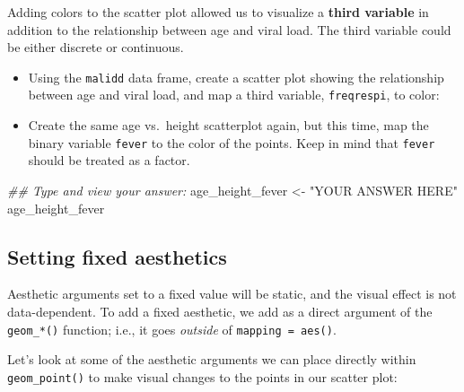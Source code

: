 \documentclass[
  letterpaper,
  DIV=11,
  numbers=noendperiod]{scrreprt}
\newenvironment{Shaded}{\begin{snugshade}}{\end{snugshade}}
\newcommand{\DocumentationTok}[1]{\textcolor[rgb]{0.37,0.37,0.37}{\textit{#1}}}
\newcommand{\NormalTok}[1]{\textcolor[rgb]{0.00,0.23,0.31}{#1}}
\newcommand{\OtherTok}[1]{\textcolor[rgb]{0.00,0.23,0.31}{#1}}
\newcommand{\StringTok}[1]{\textcolor[rgb]{0.13,0.47,0.30}{#1}}
\begin{document}
Adding colors to the scatter plot allowed us to visualize a
\textbf{third variable} in addition to the relationship between age and
viral load. The third variable could be either discrete or continuous.

\begin{tcolorbox}[enhanced jigsaw, titlerule=0mm, colback=white, left=2mm, breakable, opacitybacktitle=0.6, colbacktitle=quarto-callout-tip-color!10!white, colframe=quarto-callout-tip-color-frame, bottomtitle=1mm, opacityback=0, coltitle=black, arc=.35mm, toptitle=1mm, title=\textcolor{quarto-callout-tip-color}{\faLightbulb}\hspace{0.5em}{Practice}, leftrule=.75mm, toprule=.15mm, bottomrule=.15mm, rightrule=.15mm]

\begin{itemize}
\item
  Using the \texttt{malidd} data frame, create a scatter plot showing
  the relationship between age and viral load, and map a third variable,
  \texttt{freqrespi}, to color:
\item
  Create the same age vs.~height scatterplot again, but this time, map
  the binary variable \texttt{fever} to the color of the points. Keep in
  mind that \texttt{fever} should be treated as a factor.
\end{itemize}

\begin{Shaded}
\begin{Highlighting}[]
\DocumentationTok{\#\# Type and view your answer:}
\NormalTok{age\_height\_fever }\OtherTok{\textless{}{-}}  \StringTok{"YOUR ANSWER HERE"}
\NormalTok{age\_height\_fever}
\end{Highlighting}
\end{Shaded}

\end{tcolorbox}

\subsection{Setting fixed aesthetics}\label{setting-fixed-aesthetics}

Aesthetic arguments set to a fixed value will be static, and the visual
effect is not data-dependent. To add a fixed aesthetic, we add as a
direct argument of the \texttt{geom\_*()} function; i.e., it goes
\emph{outside} of \texttt{mapping\ =\ aes()}.

Let's look at some of the aesthetic arguments we can place directly
within \texttt{geom\_point()} to make visual changes to the points in
our scatter plot:
\end{document}
